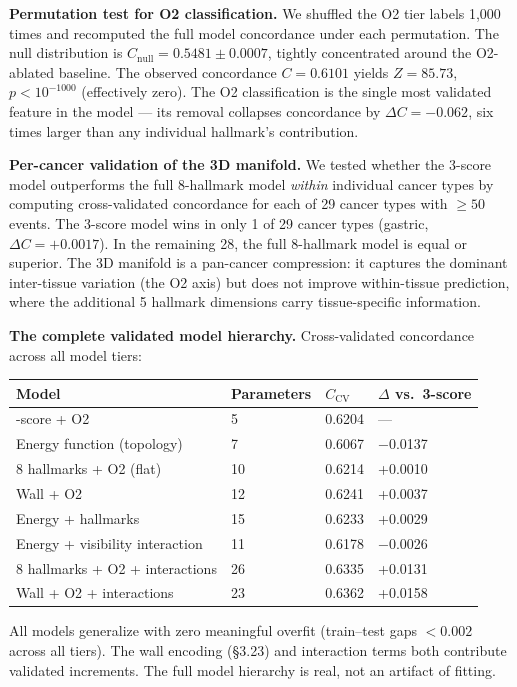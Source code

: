 \documentclass[
  11pt,
]{article}
\newcounter{none} %
\begin{document}
\textbf{Permutation test for O2 classification.} We shuffled the O2 tier
labels 1,000 times and recomputed the full model concordance under each
permutation. The null distribution is
\(C_\mathrm{null} = 0.5481 \pm 0.0007\), tightly concentrated around the
O2-ablated baseline. The observed concordance \(C = 0.6101\) yields
\(Z = 85.73\), \(p < 10^{-1000}\) (effectively zero). The O2
classification is the single most validated feature in the model --- its
removal collapses concordance by \(\Delta C = -0.062\), six times larger
than any individual hallmark's contribution.

\textbf{Per-cancer validation of the 3D manifold.} We tested whether the
3-score model outperforms the full 8-hallmark model \emph{within}
individual cancer types by computing cross-validated concordance for
each of 29 cancer types with \(\geq 50\) events. The 3-score model wins
in only 1 of 29 cancer types (gastric, \(\Delta C = +0.0017\)). In the
remaining 28, the full 8-hallmark model is equal or superior. The 3D
manifold is a pan-cancer compression: it captures the dominant
inter-tissue variation (the O2 axis) but does not improve within-tissue
prediction, where the additional 5 hallmark dimensions carry
tissue-specific information.

\textbf{The complete validated model hierarchy.} Cross-validated
concordance across all model tiers:

{\def\LTcaptype{none} %
\begin{longtable}[]{@{}llll@{}}
\toprule\noalign{}
Model & Parameters & \(C_\mathrm{CV}\) & \(\Delta\) vs.~3-score \\
\midrule\noalign{}
\endhead
\bottomrule\noalign{}
\endlastfoot
3-score + O2 & 5 & 0.6204 & --- \\
Energy function (topology) & 7 & 0.6067 & −0.0137 \\
8 hallmarks + O2 (flat) & 10 & 0.6214 & +0.0010 \\
Wall + O2 & 12 & 0.6241 & +0.0037 \\
Energy + hallmarks & 15 & 0.6233 & +0.0029 \\
Energy + visibility interaction & 11 & 0.6178 & −0.0026 \\
8 hallmarks + O2 + interactions & 26 & 0.6335 & +0.0131 \\
Wall + O2 + interactions & 23 & 0.6362 & +0.0158 \\
\end{longtable}
}

All models generalize with zero meaningful overfit (train--test gaps
\(< 0.002\) across all tiers). The wall encoding (§3.23) and interaction
terms both contribute validated increments. The full model hierarchy is
real, not an artifact of fitting.
\end{document}
